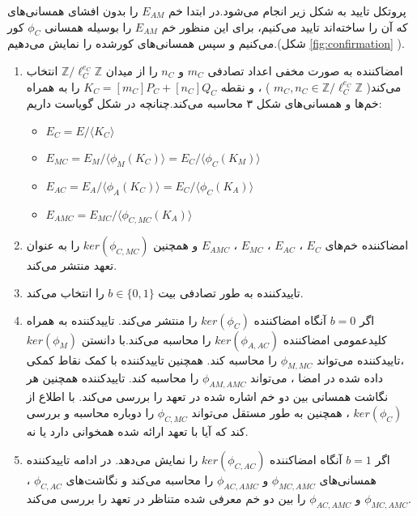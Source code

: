 \documentclass[12pt,a4paper]{article}
\begin{document}
پروتکل تایید به شکل زیر انجام می‌شود.در ابتدا خم 
$E_{AM}$
را بدون افشای همسانی‌های که آن را ساخته‌اند تایید می‌کنیم، برای این منظور خم
$E_{AM}$
را بوسیله همسانی 
$\phi_C$
کور می‌کنیم و سپس همسانی‌های کورشده را نمایش می‌دهیم‌.(شکل 
\ref{fig:confirmation}
).

\begin{enumerate}
	\item 
	امضاکننده به صورت مخفی اعداد تصادفی
	$m_C$
	و
	$n_C$
	را از میدان 
	$\mathbb{Z} / \ell_C^{e_C} \mathbb{Z}$
	انتخاب می‌کند(
	$m_C , n_C \in \mathbb{Z} / \ell_C^{e_C} \mathbb{Z}$
	)
	، و نقطه
	$K_C = [m_C]P_C + [n_C]Q_C$
	را به همراه خم‌ها و همسانی‌های شکل ۳ محاسبه می‌کند.چنانچه در شکل گویاست داریم:
	\begin{itemize}
		\item 
		$E_C = E / \langle K_C \rangle$
		
		\item 
		$E_{MC} = E_M / \langle \phi_M(K_C) \rangle = E_C / \langle \phi_C(K_M) \rangle$
		
		\item 
		$E_{AC} = E_A / \langle \phi_A(K_C) \rangle = E_C / \langle \phi_C(K_A) \rangle$
		
		\item 
		$E_{AMC} = E_{MC} / \langle \phi_{C,MC}(K_A) \rangle $
	\end{itemize}

	\item 
	امضاکننده خم‌های
	$E_C$
	،
	$E_{AC}$
	،
	$E_{MC}$
	،
	$E_{AMC}$
	و همچنین 
	$ker(\phi_{C,MC})$
	را به عنوان تعهد منتشر می‌کند.
	
	\item 
	تاییدکننده به طور تصادفی بیت 
	$b \in \{0,1\}$
	را انتخاب می‌کند.
	
	\item 
	اگر 
	 $b=0$
	 آنگاه امضاکننده 
	 $ker(\phi_C)$
	 را منتشر می‌کند. تاییدکننده به همراه کلیدعمومی امضاکننده 
	 $ker(\phi_{A,AC})$
	 را محاسبه می‌کند.با دانستن
	 $ker(\phi_M)$
	 ،تاییدکننده می‌تواند 
	 $\phi_{M,MC}$
	 را محاسبه کند. همچنین تاییدکننده با کمک نقاط کمکی داده شده در امضا ، می‌تواند
	 $\phi_{AM,AMC}$
	 را محاسبه کند. تاییدکننده همچنین هر نگاشت همسانی‌ بین دو خم اشاره شده در تعهد را بررسی می‌کند.
با اطلاع از 
$ker(\phi_C)$
، همچنین به طور مستقل می‌تواند 
$\phi_{C,MC}$
را دوباره محاسبه و بررسی کند که آیا با تعهد ارائه شده همخوانی دارد یا نه.

\item 
اگر
$b=1$
آنگاه امضاکننده 
$ker(\phi_{C,AC})$
را نمایش می‌دهد. در ادامه تاییدکننده همسانی‌های 
$\phi_{MC,AMC}$
و
$\phi_{AC,AMC}$
را محاسبه می‌کند و نگاشت‌های 
$\phi_{C,AC}$
،
$\phi_{MC,AMC}$
و
$\phi_{AC,AMC}$
را بین دو خم معرفی شده متناظر در تعهد را بررسی می‌کند.
\end{enumerate}
\end{document}
